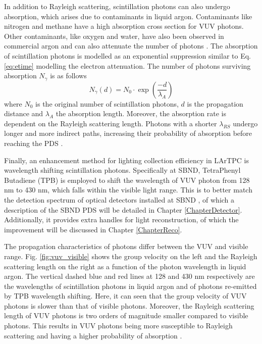 
In addition to Rayleigh scattering, scintillation photons can also undergo absorption, which arises due to contaminants in liquid argon.
Contaminants like nitrogen \cite{photon_nitrogen} and methane \cite{photon_methane} have a high absorption cross section for VUV photons.
Other contaminants, like oxygen and water, have also been observed in commercial argon and can also attenuate the number of photons \cite{photon_commercial}. 
The absorption of scintillation photons is modelled as an exponential suppression similar to Eq. \ref{eq:etime} modelling the electron attenuation.
The number of photons surviving absorption $N_\gamma$ is as follows 
\begin{equation}
	N_{\gamma} (d) = N_0 \cdot \exp\left(\frac{-d}{\lambda_{A}}\right)
\label{eq:absorption}
\end{equation}
where $N_0$ is the original number of scintillation photons, $d$ is the propagation distance and $\lambda_A$ the absorption length.
Moreover, the absorption rate is dependent on the Rayleigh scattering length. 
Photons with a shorter $\lambda_{RS}$ undergo longer and more indirect paths, increasing their probability of absorption before reaching the PDS \cite{PatrickPhD}.



Finally, an enhancement method for lighting collection efficiency in LArTPC is wavelength shifting scintillation photons.
Specifically at SBND, TetraPhenyl Butadiene (TPB) is employed to shift the wavelength of VUV photon from 128 nm to 430 nm, which falls within the visible light range.
This is to better match the detection spectrum of optical detectors installed at SBND \cite{sbnd_pds_paper}, of which a description of the SBND PDS will be detailed in Chapter \ref{ChapterDetector}.
Additionally, it provides extra handles for light reconstruction, of which the improvement will be discussed in Chapter \ref{ChapterReco}.

The propagation characteristics of photons differ between the VUV and visible range.
Fig. \ref{fig:vuv_visible} shows the group velocity on the left and the Rayleigh scattering length on the right as a function of the photon wavelength in liquid argon.
The vertical dashed blue and red lines at 128 and 430 nm respectively are the wavelengths of scintillation photons in liquid argon and of photons re-emitted by TPB wavelength shifting. 
Here, it can seen that the group velocity of VUV photons is slower than that of visible photons.
Moreover, the Rayleigh scattering length of VUV photons is two orders of magnitude smaller compared to visible photons.
This results in VUV photons being more susceptible to Rayleigh scattering and having a higher probability of absorption \cite{PatrickPhD}.

